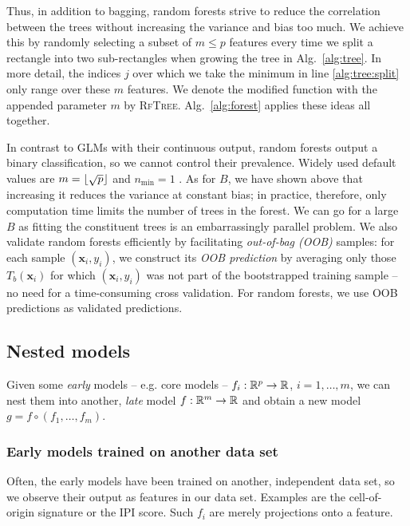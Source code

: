Thus, in addition to bagging, random forests strive to reduce the correlation between the trees 
without increasing the variance and bias too much. We achieve this by randomly selecting a subset
of $m \leq p$ features every time we split a rectangle into two sub-rectangles when growing the 
tree in Alg.\ \ref{alg:tree}. In more detail, the indices $j$ over which we take the minimum in 
line \ref{alg:tree:split} only range over 
these $m$ features. We denote the modified function with the appended parameter $m$ by 
\textsc{RfTree}. Alg.\ \ref{alg:forest} applies these ideas all together.



In contrast to GLMs with their continuous output, random forests output a binary classification,
so we cannot control their prevalence. Widely used default values are $m = \lfloor\sqrt{p}\rfloor$ and 
$n_\text{min} = 1$ \cite{breiman01}. As for $B$, we have 
shown above that increasing it reduces the variance at constant bias; in practice, therefore, only 
computation time limits the number of trees in the forest. We can go for a large $B$ as fitting the 
constituent trees is an embarrassingly parallel problem. We 
also validate random forests efficiently by facilitating \textit{out-of-bag (OOB)} samples: 
for each sample $(\mathbf{x}_i, y_i)$, we construct its \textit{OOB prediction} by averaging only 
those $T_b(\mathbf{x}_i)$ for which $(\mathbf{x}_i, y_i)$ was not part of the bootstrapped training 
sample -- no need for a time-consuming cross validation. For random forests, we use OOB predictions 
as validated predictions.

\subsection{Nested models}\label{subsec:nested-models}

Given some \textit{early} models -- e.g. core models -- $f_i: \mathbb{R}^p \to \mathbb{R}$, $i = 1, \ldots, m$, 
we can nest them into another, \textit{late} model $f: \mathbb{R}^m \to \mathbb{R}$ and obtain a new model 
$g = f \circ (f_1, \ldots, f_m)$. 

\subsubsection{Early models trained on another data set}
Often, the early models have been trained on another, independent data set, so we observe their 
output as features in our data set. Examples are the cell-of-origin signature or the IPI score. 
Such $f_i$ are merely projections onto a feature.

